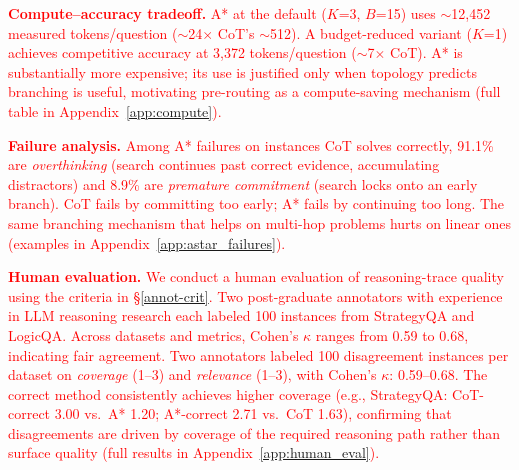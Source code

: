 \documentclass[11pt]{article}
\begin{document}
{\textcolor{red}{\textbf{Compute--accuracy tradeoff.}}
\textcolor{red}{A* at the default ($K$=3, $B$=15) uses $\sim$12,452 measured tokens/question ($\sim$24$\times$ CoT's $\sim$512). A budget-reduced variant ($K$=1) achieves competitive accuracy at 3,372 tokens/question ($\sim$7$\times$ CoT). A* is substantially more expensive; its use is justified only when topology predicts branching is useful, motivating pre-routing as a compute-saving mechanism (full table in Appendix~\ref{app:compute}).}

\textcolor{red}{\textbf{Failure analysis.}}
\textcolor{red}{Among A* failures on instances CoT solves correctly, 91.1\% are \emph{overthinking} (search continues past correct evidence, accumulating distractors) and 8.9\% are \emph{premature commitment} (search locks onto an early branch). CoT fails by committing too early; A* fails by continuing too long. The same branching mechanism that helps on multi-hop problems hurts on linear ones (examples in Appendix~\ref{app:astar_failures}).}

\textcolor{red}{\textbf{Human evaluation.} We conduct a human evaluation of reasoning-trace quality using the criteria in \S\ref{annot-crit}. Two post-graduate annotators with experience in LLM reasoning research each labeled 100 instances from StrategyQA and LogicQA. Across datasets and metrics, Cohen's \(\kappa\) ranges from 0.59 to 0.68, indicating fair agreement. Two annotators labeled 100 disagreement instances per dataset on \emph{coverage} (1--3) and \emph{relevance} (1--3), with Cohen's $\kappa$: 0.59--0.68. The correct method consistently achieves higher coverage (e.g., StrategyQA: CoT-correct 3.00 vs.\ A* 1.20; A*-correct 2.71 vs.\ CoT 1.63), confirming that disagreements are driven by coverage of the required reasoning path rather than surface quality (full results in Appendix~\ref{app:human_eval}).}












}
\end{document}
